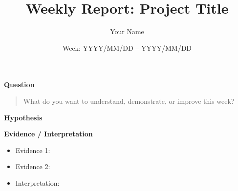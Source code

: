 \documentclass[11pt,a4paper]{ltjsarticle}
\title{Weekly Report: Project Title}
\author{Your Name}
\date{Week: YYYY/MM/DD -- YYYY/MM/DD}
\newcommand{\sectionblock}[1]{%
  \vspace{4mm}
  {\large\textbf{#1}}
  \vspace{2mm}

}
\begin{document}
\maketitle




\sectionblock{Question}


\begin{quote}
What do you want to understand, demonstrate, or improve this week?
\end{quote}

\sectionblock{Hypothesis}






\sectionblock{Evidence / Interpretation}





\begin{itemize}[leftmargin=8mm]
  \item Evidence 1:
  \item Evidence 2:
  \item Interpretation:
\end{itemize}
\end{document}
